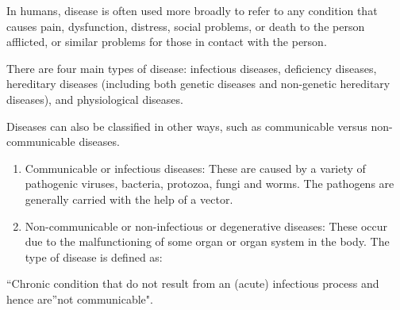 \documentclass[
  openany]{book}
\begin{document}
In humans, disease is often used more broadly to refer to any condition that causes pain, dysfunction, distress, social problems, or death to the person afflicted, or similar problems for those in contact with the person.

There are four main types of disease: infectious diseases, deficiency diseases, hereditary diseases (including both genetic diseases and non-genetic hereditary diseases), and physiological diseases.

Diseases can also be classified in other ways, such as communicable versus non-communicable diseases.

\begin{enumerate}
\def\labelenumi{\arabic{enumi}.}
\item
  Communicable or infectious diseases: These are caused by a variety of pathogenic viruses, bacteria, protozoa, fungi and worms. The pathogens are generally carried with the help of a vector.
\item
  Non-communicable or non-infectious or degenerative diseases: These occur due to the malfunctioning of some organ or organ system in the body. The type of disease is defined as:
\end{enumerate}

``Chronic condition that do not result from an (acute) infectious process and hence are''not communicable".
\end{document}
